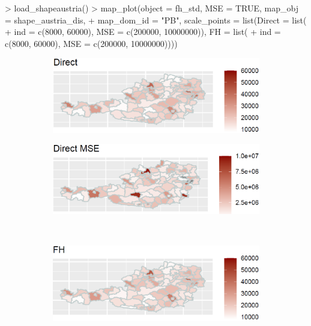 \begin{example}
\begin{example}
> load_shapeaustria()
> map_plot(object = fh_std, MSE = TRUE, map_obj = shape_austria_dis,
+   map_dom_id = "PB", scale_points = list(Direct = list(
+   ind = c(8000, 60000), MSE = c(200000, 10000000)), FH = list(
+   ind = c(8000, 60000), MSE = c(200000, 10000000))))
\end{example}
\begin{figure}[H]
    \begin{subfigure}[t]{0.49\textwidth}
        \includegraphics[width=\textwidth]{figures/map1.png}
        \caption{}
        \label{fig:mapa}
    \end{subfigure}\hfill%
    \begin{subfigure}[t]{0.49\textwidth}
        \includegraphics[width=\textwidth]{figures/map2.png}
        \caption{}
        \label{fig:mapb}
    \end{subfigure}\\[5pt]%
    \begin{subfigure}[t]{0.49\textwidth}
        \includegraphics[width=\textwidth]{figures/map3.png}
        \caption{}

\end{subfigure}
\end{figure}
\end{example}
